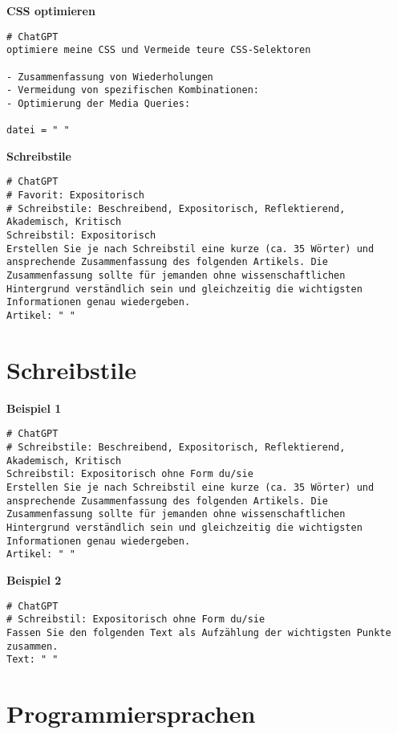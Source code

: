 \documentclass[12pt,a4paper]{scrartcl}
\begin{document}
\textbf{CSS optimieren}

\begin{lstlisting}
# ChatGPT
optimiere meine CSS und Vermeide teure CSS-Selektoren 

- Zusammenfassung von Wiederholungen
- Vermeidung von spezifischen Kombinationen:
- Optimierung der Media Queries: 

datei = " "
\end{lstlisting}

\textbf{Schreibstile}

\begin{lstlisting}
# ChatGPT
# Favorit: Expositorisch
# Schreibstile: Beschreibend, Expositorisch, Reflektierend, Akademisch, Kritisch
Schreibstil: Expositorisch
Erstellen Sie je nach Schreibstil eine kurze (ca. 35 Wörter) und ansprechende Zusammenfassung des folgenden Artikels. Die Zusammenfassung sollte für jemanden ohne wissenschaftlichen Hintergrund verständlich sein und gleichzeitig die wichtigsten Informationen genau wiedergeben. 
Artikel: " "
\end{lstlisting}

\hypertarget{schreibstile}{%
\section{Schreibstile}\label{schreibstile}}

\textbf{Beispiel 1}

\begin{lstlisting}
# ChatGPT
# Schreibstile: Beschreibend, Expositorisch, Reflektierend, Akademisch, Kritisch
Schreibstil: Expositorisch ohne Form du/sie
Erstellen Sie je nach Schreibstil eine kurze (ca. 35 Wörter) und ansprechende Zusammenfassung des folgenden Artikels. Die Zusammenfassung sollte für jemanden ohne wissenschaftlichen Hintergrund verständlich sein und gleichzeitig die wichtigsten Informationen genau wiedergeben. 
Artikel: " "
\end{lstlisting}

\textbf{Beispiel 2}

\begin{lstlisting}
# ChatGPT
# Schreibstil: Expositorisch ohne Form du/sie
Fassen Sie den folgenden Text als Aufzählung der wichtigsten Punkte zusammen. 
Text: " "
\end{lstlisting}

\hypertarget{programmiersprachen}{%
\section{Programmiersprachen}\label{programmiersprachen}}
\end{document}
